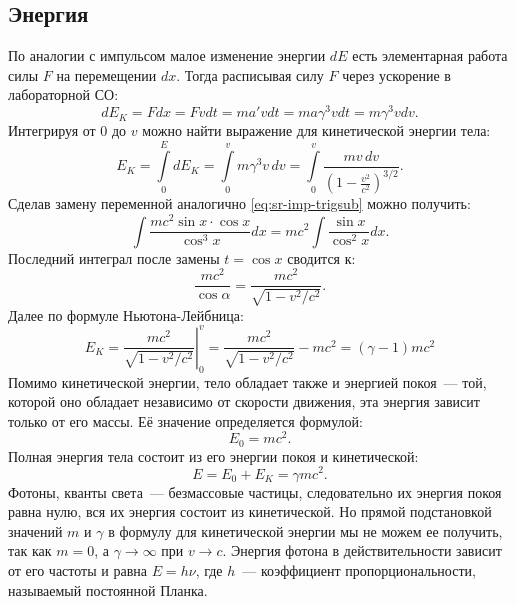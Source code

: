 \subsection{Энергия}
По аналогии с импульсом малое изменение энергии $dE$ есть элементарная работа силы $F$ на перемещении $dx$. Тогда расписывая силу $F$ через ускорение в лабораторной СО:
\begin{equation*}
	dE_K = F dx = F v dt = m a' v dt = m a \gamma^{3} v dt = m \gamma^{3} v dv.
\end{equation*}
Интегрируя от 0 до $v$ можно найти выражение для кинетической энергии тела:
\begin{equation*}
	E_K = \int\limits_0^{E} dE_K = \int\limits_0^{v} m \gamma^{3}v \,dv= \int\limits_0^{v} \frac{m v \, dv}{\left(1 - \frac{v^2}{c^2}\right)^{3/2}}.
\end{equation*}
Сделав замену переменной аналогично \eqref{eq:sr-imp-trigsub} можно получить:
\begin{equation*}
	\int \frac{m c^2 \sin x \cdot \cos x}{\cos ^{3} x} d x=m c^2 \int \frac{\sin x}{\cos ^2 x} d x.
\end{equation*}
Последний интеграл после замены $t = \cos x$ сводится к:
\begin{equation*}
	\frac{m c^2}{\cos \alpha}=\frac{m c^2}{\sqrt{1-v^2 / c^2}}.
\end{equation*}
Далее по формуле Ньютона-Лейбница:
\begin{equation}
E_K=\left.\frac{m c^2}{\sqrt{1-v^2 / c^2}}\right|_0 ^v=\frac{m c^2}{\sqrt{1-v^2 / c^2}}-m c^2=(\gamma-1) m c^2
\end{equation}
Помимо кинетической энергии, тело обладает также и энергией покоя~--- той, которой оно обладает независимо от скорости движения, эта энергия зависит только от его массы. Её значение определяется формулой:
\begin{equation}
	E_0 = m c^2.
\end{equation}
Полная энергия тела состоит из его энергии покоя и кинетической:
\begin{equation}
	E=E_0+E_K=\gamma m c^2.
\end{equation}
Фотоны, кванты света~--- безмассовые частицы, следовательно их энергия покоя равна нулю, вся их энергия состоит из кинетической. Но прямой подстановкой значений $m$ и $\gamma$ в формулу для кинетической энергии мы не можем ее получить, так как $m=0$, а $\gamma \rightarrow \infty$ при $v \rightarrow c$. Энергия фотона в действительности зависит от его частоты и равна $E=h \nu$, где $h$~--- коэффициент пропорциональности, называемый постоянной Планка.